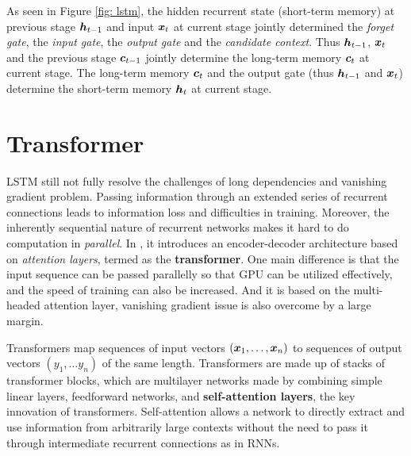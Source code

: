 \documentclass[11pt]{article}
\begin{document}
As seen in Figure \ref{fig: lstm}, the hidden recurrent state (short-term memory) at previous stage $\boldsymbol{h}_{t-1}$ and input $\boldsymbol{x}_{t}$ at current stage jointly determined the \emph{forget gate}, the \emph{input gate}, the \emph{output gate} and the \emph{candidate context}. Thus $\boldsymbol{h}_{t-1}$,  $\boldsymbol{x}_{t}$ and the previous stage $\boldsymbol{c}_{t-1}$ jointly determine the long-term memory $\boldsymbol{c}_{t}$ at current stage. The long-term memory $\boldsymbol{c}_{t}$ and the output gate (thus $\boldsymbol{h}_{t-1}$ and  $\boldsymbol{x}_{t}$) determine the short-term memory  $\boldsymbol{h}_{t}$ at current stage. 


\section{Transformer}
LSTM still not fully resolve the challenges of long dependencies and vanishing gradient problem. Passing information through an extended series of recurrent connections leads to information loss and difficulties in training. Moreover, the inherently sequential nature of recurrent networks makes it hard to do computation in \emph{parallel}. In \citep{vaswani2017attention},  it introduces an encoder-decoder architecture based on \emph{attention layers}, termed as the \textbf{transformer}. One main difference is that the input sequence can be passed parallelly so that GPU can be utilized effectively, and the speed of training can also be increased. And it is based on the multi-headed attention layer, vanishing gradient issue is also overcome by a large margin. 

Transformers map sequences of input vectors $(\boldsymbol{x}_1, \ldots, \boldsymbol{x}_n)$ to sequences of output vectors $(y_1, \ldots y_n)$ of the same length.  Transformers are made up of stacks of transformer blocks, which are multilayer networks made by combining simple linear layers, feedforward networks, and \textbf{self-attention layers}, the key innovation of transformers. Self-attention allows a network to directly extract and use information from arbitrarily large contexts without the need to pass it through intermediate recurrent connections as in RNNs. 
\end{document}
